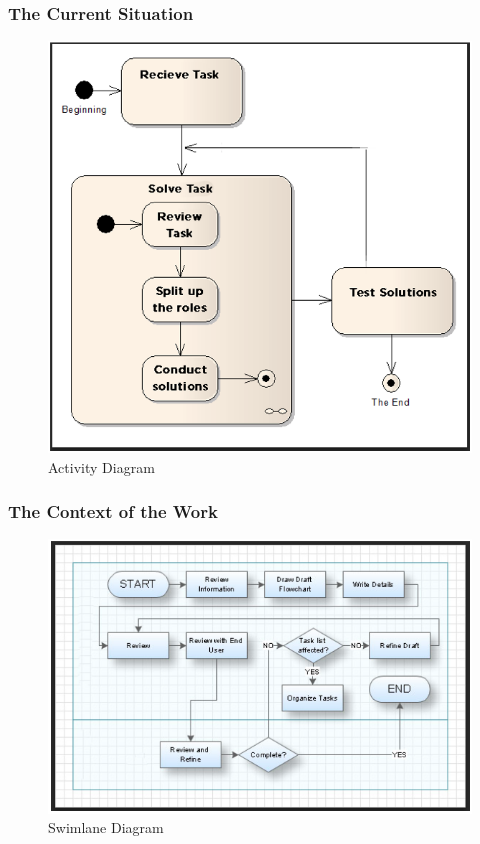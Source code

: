 \documentclass[11pt, oneside]{article}   	%
\begin{document}
\subsubsection*{The Current Situation}
\begin{figure}[H] %
   \centering
   \includegraphics[width=6in]{ActivityDiagram.png} 
   \caption{Activity Diagram}
   \label{fig:example}
\end{figure}


\subsubsection*{The Context of the Work}
\begin{figure}[H] %
   \centering
   \includegraphics[width=6in]{Swimlane.png} 
   \caption{Swimlane Diagram}
   \label{fig:example}
\end{figure}
\end{document}
